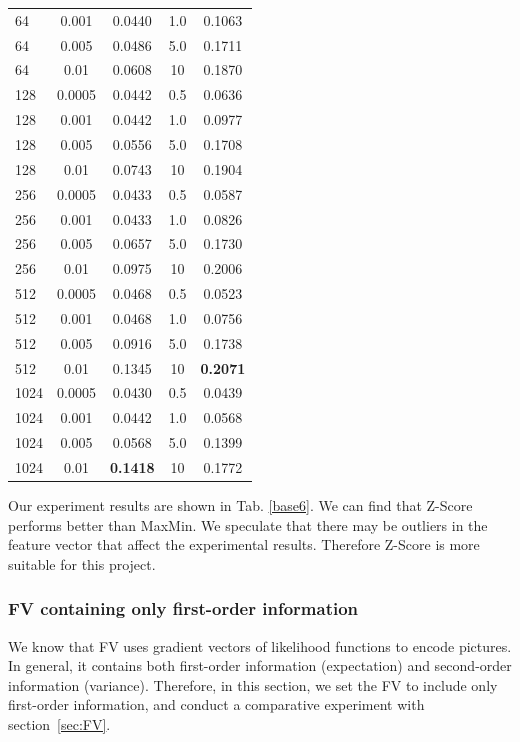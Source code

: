 \documentclass[conference]{IEEEtran}
\begin{document}
\begin{table}[htbp]
\begin{tabular}{@{}p{1cm}<{\centering}|c|c|c|c}
		64   & 0.001  & 0.0440 & 1.0 & 0.1063\\
		64   & 0.005  & 0.0486 & 5.0 & 0.1711\\
        64   & 0.01  & 0.0608 & 10 & 0.1870\\
        \hline
		128   & 0.0005  & 0.0442 & 0.5 & 0.0636\\
		128   & 0.001  & 0.0442 & 1.0 & 0.0977\\
		128   & 0.005  & 0.0556 & 5.0 & 0.1708\\
        128   & 0.01  & 0.0743 & 10 & 0.1904\\
        \hline
		256   & 0.0005  & 0.0433 & 0.5 & 0.0587\\
		256   & 0.001  & 0.0433 & 1.0 & 0.0826\\
		256   & 0.005  & 0.0657 & 5.0 & 0.1730\\
        256   & 0.01  & 0.0975 & 10 & 0.2006\\
        \hline
		512   & 0.0005  & 0.0468 & 0.5 & 0.0523\\
		512   & 0.001  & 0.0468 & 1.0 & 0.0756\\
		512   & 0.005  & 0.0916 & 5.0 & 0.1738\\
        512   & 0.01  & 0.1345 & 10 & \textbf{0.2071}\\
        \hline
		1024   & 0.0005  & 0.0430 & 0.5 & 0.0439\\
		1024   & 0.001  & 0.0442 & 1.0 & 0.0568\\
		1024   & 0.005  & 0.0568 & 5.0 & 0.1399\\
		1024   & 0.01  & \textbf{0.1418} & 10 & 0.1772\\
		\hline
	\end{tabular}
\end{table}

Our experiment results are shown in Tab. \ref{base6}. We can find that Z-Score performs better than MaxMin.
We speculate that there may be outliers in the feature vector that affect the experimental results. Therefore Z-Score is more suitable for this project.
\subsubsection{FV containing only first-order information}
We know that FV uses gradient vectors of likelihood functions to encode pictures. In general, it contains both first-order information (expectation) and second-order information (variance). Therefore, in this section, we set the FV to include only first-order information, and conduct a comparative experiment with section~\ref{sec:FV}.
\end{document}
